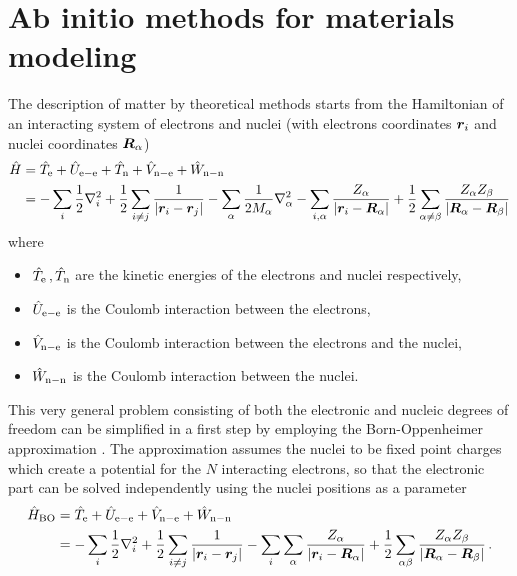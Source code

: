 \documentclass[main.tex]{subfiles}
\begin{document}
\chapter{Ab initio methods for materials modeling}\label{chap:ab-initio-modeling}


The description of matter by theoretical methods starts from the Hamiltonian of an interacting system of electrons and nuclei (with electrons coordinates \(\vb*{r}_i\) and nuclei coordinates \(\vb*{R}_{\alpha}\))
\begin{align}
    \hat{H} &= \hat{T}_{\mathrm{e}} + \hat{U}_{\mathrm{e-e}} + \hat{T}_{\mathrm{n}} + \hat{V}_{\mathrm{n-e}} + \hat{W}_{\mathrm{n-n}} \\
    &= - \sum_i \frac{1}{2} \nabla^2_i 
    + \frac{1}{2} \sum_{i \neq j} \frac{1}{\vert \vb*{r}_i - \vb*{r}_j \vert} 
    - \sum_{\alpha} \frac{1}{2 M_{\alpha}} \nabla^2_{\alpha}
    - \sum_{i, \alpha} \frac{Z_{\alpha}}{\vert \vb*{r}_i - \vb*{R}_{\alpha} \vert} 
    + \frac{1}{2} \sum_{\alpha \neq \beta} \frac{Z_{\alpha} Z_{\beta}}{\vert \vb*{R}_{\alpha} - \vb*{R}_{\beta} \vert}
\end{align}
where
\begin{itemize}
    \item \(\hat{T}_{\mathrm{e}}\,, \hat{T}_{\mathrm{n}}\) are the kinetic energies of the electrons and nuclei respectively,
    \item \(\hat{U}_{\mathrm{e-e}}\) is the Coulomb interaction between the electrons,
    \item \(\hat{V}_{\mathrm{n-e}}\) is the Coulomb interaction between the electrons and the nuclei,
    \item \(\hat{W}_{\mathrm{n-n}}\) is the Coulomb interaction between the nuclei.
\end{itemize}
This very general problem consisting of both the electronic and nucleic degrees of freedom can be simplified in a first step by employing the Born-Oppenheimer approximation \cite{born_zur_1927}.
The approximation assumes the nuclei to be fixed point charges which create a potential for the \(N\) interacting electrons, so that the electronic part can be solved independently using the nuclei positions as a parameter
\begin{align}
    \hat{H}_{\mathrm{BO}} &= \hat{T}_{\mathrm{e}} + \hat{U}_{\mathrm{e-e}} + \hat{V}_{\mathrm{n-e}} + \hat{W}_{\mathrm{n-n}} \\
    &= -\sum_i \frac{1}{2} \nabla^2_i 
    + \frac{1}{2} \sum_{i \neq j} \frac{1}{\vert \vb*{r}_i - \vb*{r}_j \vert} 
    - \sum_i \sum_{\alpha} \frac{Z_{\alpha}}{\vert \vb*{r}_i 
    - \vb*{R}_{\alpha} \vert} 
    + \frac{1}{2} \sum_{\alpha \beta} \frac{Z_{\alpha} Z_{\beta}}{\vert \vb*{R}_{\alpha} - \vb*{R}_{\beta} \vert}\,. \label{eq:bo_hamiltonian}
\end{align}
\end{document}
